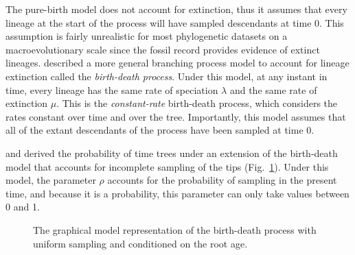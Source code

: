 The pure-birth model does not account for  extinction, thus it assumes that every lineage at the start of the process will have sampled descendants at time 0.
This assumption is fairly unrealistic for most phylogenetic datasets on a macroevolutionary scale since the fossil record provides evidence of extinct lineages.
\citet{kendall48} described a more general branching process model to account for lineage extinction called the \textit{birth-death process}.
Under this model, at any instant in time, every lineage has the same rate of speciation $\lambda$ and the same rate of extinction $\mu$.
This is the \textit{constant-rate} birth-death process, which considers the rates constant over time and over the tree.
Importantly, this model assumes that all of the extant descendants of the process have been sampled at time 0.

\citet{yang97b} and \citet{stadler09} derived the probability of time trees under an extension of the birth-death model that accounts for incomplete sampling of the tips (Fig.~\ref{bdrGMFig1}). 
Under this model, the parameter $\rho$ accounts for the probability of sampling in the present time, and because it is a probability, this parameter can only take values between 0 and 1. 
\begin{figure}[h!]
\centering
{}
\caption{\small The graphical model representation of the birth-death process with uniform sampling and conditioned on the root age.}
\label{bdrGMFig1}
\end{figure}

